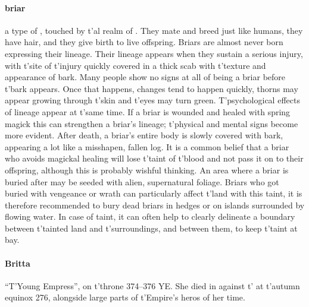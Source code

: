 \paragraph{briar} a type of , touched by t'\allowbreak {}al realm of . They mate and breed just like humans, they have hair, and they give birth to live offspring. Briars are almost never born expressing their lineage. Their lineage appears when they sustain a serious injury, with t'\allowbreak site of t'\allowbreak injury quickly covered in a thick scab with t'\allowbreak texture and appearance of bark. Many people show no signs at all of being a briar before t'\allowbreak bark appears. Once that happens, changes tend to happen quickly, thorns may appear growing through t'\allowbreak skin and t'\allowbreak eyes may turn green. T'psychological effects of lineage appear at t'\allowbreak same time. If a briar is wounded and healed with spring magick this can strengthen a briar's lineage; t'\allowbreak physical and mental signs become more evident. After death, a briar’s entire body is slowly covered with bark, appearing a lot like a misshapen, fallen log. It is a common belief that a briar who avoids magickal healing will lose t'\allowbreak taint of t'\allowbreak blood and not pass it on to their offspring, although this is probably wishful thinking. An area where a briar is buried after  may be seeded with alien, supernatural foliage. Briars who got buried with vengeance or wrath can particularly affect t'\allowbreak land with this taint, it is therefore recommended to bury dead briars in hedges or on islands surrounded by flowing water. In case of taint, it can often help to clearly delineate a boundary between t'\allowbreak tainted land and t'\allowbreak surroundings, and  between them, to keep t'\allowbreak taint at bay.
\paragraph{Britta} “T'Young Empress”, on t'\allowbreak throne 374–376 YE. She died in  against t'\allowbreak {} at t'\allowbreak autumn equinox 276, alongside large parts of t'\allowbreak Empire's heros of her time.
